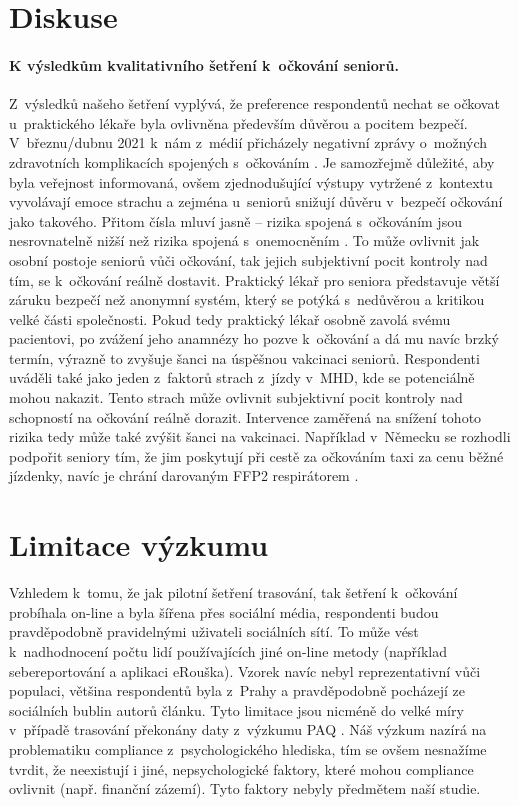 \section*{Diskuse}

\paragraph*{K výsledkům kvalitativního šetření k~očkování seniorů.}
Z~výsledků našeho šetření vyplývá, že preference respondentů nechat se očkovat u~praktického lékaře byla ovlivněna především důvěrou a pocitem bezpečí. V~březnu/dubnu 2021 k~nám z~médií přicházely negativní zprávy o~možných zdravotních komplikacích spojených s~očkováním \cite{Svamberk2021,MinisterstvoZdravotnictviCR2021a}. Je samozřejmě důležité, aby byla veřejnost informovaná, ovšem zjednodušující výstupy vytržené z~kontextu vyvolávají emoce strachu a zejména u~seniorů snižují důvěru v~bezpečí očkování jako takového. Přitom čísla mluví jasně – rizika spojená s~očkováním jsou nesrovnatelně nižší než rizika spojená s~onemocněním \cite{Statniustavprokontroluleciv2021}. 
To může ovlivnit jak osobní postoje seniorů vůči očkování, tak jejich subjektivní pocit kontroly nad tím, se k~očkování reálně dostavit. Praktický lékař pro seniora představuje větší záruku bezpečí než anonymní systém, který se potýká s~nedůvěrou a kritikou velké části společnosti. Pokud tedy praktický lékař osobně zavolá svému pacientovi, po zvážení jeho anamnézy ho pozve k~očkování a dá mu navíc brzký termín, výrazně to zvyšuje šanci na úspěšnou vakcinaci seniorů.
Respondenti uváděli také jako jeden z~faktorů strach z~jízdy v~MHD, kde se potenciálně mohou nakazit. Tento strach může ovlivnit subjektivní pocit kontroly nad schopností na očkování reálně dorazit. Intervence zaměřená na snížení tohoto rizika tedy může také zvýšit šanci na vakcinaci. Například v~Německu se rozhodli podpořit seniory tím, že jim poskytují při cestě za očkováním taxi za cenu běžné jízdenky, navíc je chrání darovaným FFP2 respirátorem \cite{Kreijger2021}.

\section*{Limitace výzkumu}

Vzhledem k~tomu, že jak pilotní šetření trasování, tak šetření k~očkování probíhala on-line a byla šířena přes sociální média, respondenti budou pravděpodobně pravidelnými uživateli sociálních sítí. To může vést k~nadhodnocení počtu lidí používajících jiné on-line metody (například sebereportování a aplikaci eRouška). 
Vzorek navíc nebyl reprezentativní vůči populaci, většina respondentů byla z~Prahy a pravděpodobně pocházejí ze sociálních bublin autorů článku.
Tyto limitace jsou nicméně do velké míry v~případě trasování překonány daty z~výzkumu PAQ \cite{Prokop2021a}.
Náš výzkum nazírá na problematiku compliance z~psychologického hlediska, tím se ovšem nesnažíme tvrdit, že neexistují i jiné, nepsychologické faktory, které mohou compliance ovlivnit (např. finanční zázemí). Tyto faktory nebyly předmětem naší studie.


